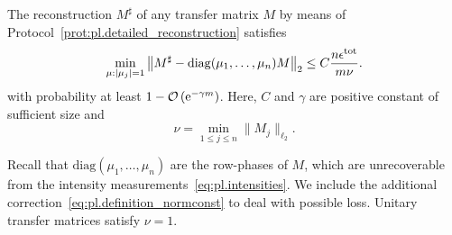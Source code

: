 \begin{corollary}%
  \label{cor:pl.performance_guarantee}
  The reconstruction ${M}^\sharp$ of any transfer matrix ${M}$ by means of Protocol~\ref{prot:pl.detailed_reconstruction} satisfies
    \[
      \min_{{\mu}: {\vert\mu_j\vert} = 1} \left\|  {M}^\sharp -  \mathrm{diag}(\mu_1,\ldots,\mu_n) {M} \right\|_2
      \leq C \frac{n \epsilon^\mathrm{tot}}{m \nu}.
      \label{eq:pl.total_bound}
    \]
  with probability at least $1 - {\mathcal{O}} \left( \mathrm{e}^{-\gamma m}\right)$.
  Here, $C$ and $\gamma$ are positive constant of sufficient size and
  \[
    \nu = \min_{1 \leq j \leq n} \| {M}_j \|_{\ell_2}.
    \label{eq:pl.definition_normconst}
  \]
\end{corollary}
Recall that $\mathrm{diag}(\mu_1, \ldots, \mu_n)$ are the row-phases of ${M}$, which are unrecoverable from the intensity measurements~\eqref{eq:pl.intensities}.
We include the additional correction~\eqref{eq:pl.definition_normconst} to deal with possible loss.
Unitary transfer matrices satisfy $\nu = 1$.

